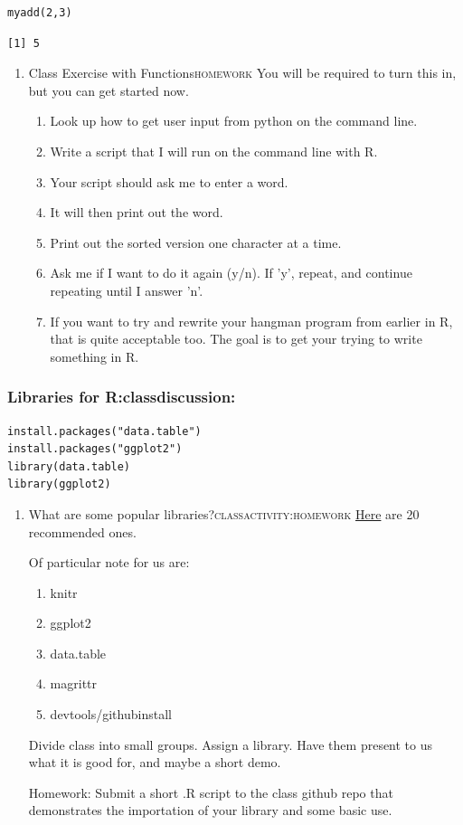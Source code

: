 \documentclass{article}
\begin{document}
\begin{verbatim}
myadd(2,3)
\end{verbatim}

\begin{verbatim}
[1] 5
\end{verbatim}

\begin{enumerate}
\item Class Exercise with Functions\hfill{}\textsc{homework}
\label{sec:org178cde9}
You will be required to turn this in, but you can get started now. 
\begin{enumerate}
\item Look up how to get user input from python on the command line.
\item Write a script that I will run on the command line with R.
\item Your script should ask me to enter a word.
\item It will then print out the word.
\item Print out the sorted version one character at a time.
\item Ask me if I want to do it again (y/n). If 'y', repeat, and continue repeating until I answer 'n'.
\item If you want to try and rewrite your hangman program from earlier in R, that is quite acceptable too. The goal is to get your trying to write something in R.
\end{enumerate}
\end{enumerate}
\subsubsection{Libraries for R:classdiscussion:}
\label{sec:orgc125b42}
\begin{verbatim}
install.packages("data.table")
install.packages("ggplot2")
library(data.table)
library(ggplot2)
\end{verbatim}
\begin{enumerate}
\item What are some popular libraries?\hfill{}\textsc{classactivity:homework}
\label{sec:org4a88bc6}
\href{https://pythontips.com/2013/07/30/20-python-libraries-you-cant-live-without/}{Here} are 20 recommended ones.

Of particular note for us are:
\begin{enumerate}
\item knitr
\item ggplot2
\item data.table
\item magrittr
\item devtools/githubinstall
\end{enumerate}

Divide class into small groups. Assign a library. Have them present to us what it is good for, and maybe a short demo. 

Homework: Submit a short .R script to the class github repo that demonstrates the importation of your library and some basic use.
\end{enumerate}
\end{document}
